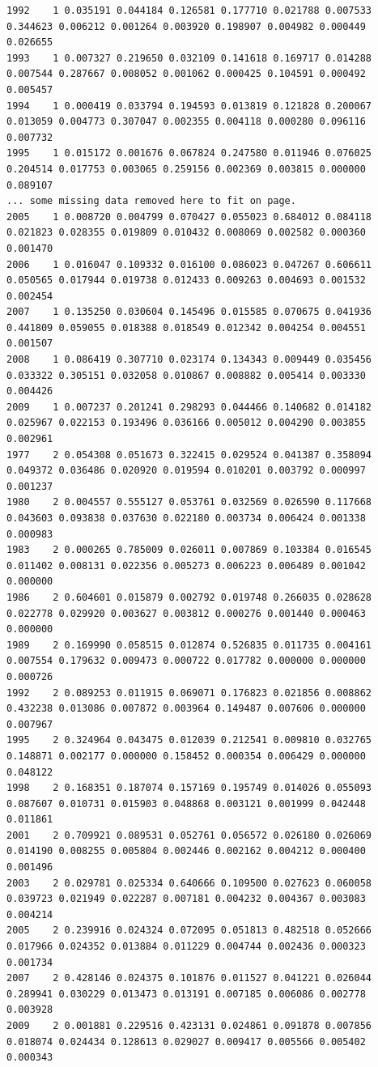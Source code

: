\begin{landscape}
\begin{table}
\begin{footnotesize}
\begin{verbatim}
1992    1 0.035191 0.044184 0.126581 0.177710 0.021788 0.007533 0.344623 0.006212 0.001264 0.003920 0.198907 0.004982 0.000449 0.026655
1993    1 0.007327 0.219650 0.032109 0.141618 0.169717 0.014288 0.007544 0.287667 0.008052 0.001062 0.000425 0.104591 0.000492 0.005457
1994    1 0.000419 0.033794 0.194593 0.013819 0.121828 0.200067 0.013059 0.004773 0.307047 0.002355 0.004118 0.000280 0.096116 0.007732
1995    1 0.015172 0.001676 0.067824 0.247580 0.011946 0.076025 0.204514 0.017753 0.003065 0.259156 0.002369 0.003815 0.000000 0.089107
...	some missing data removed here to fit on page.
2005    1 0.008720 0.004799 0.070427 0.055023 0.684012 0.084118 0.021823 0.028355 0.019809 0.010432 0.008069 0.002582 0.000360 0.001470
2006    1 0.016047 0.109332 0.016100 0.086023 0.047267 0.606611 0.050565 0.017944 0.019738 0.012433 0.009263 0.004693 0.001532 0.002454
2007    1 0.135250 0.030604 0.145496 0.015585 0.070675 0.041936 0.441809 0.059055 0.018388 0.018549 0.012342 0.004254 0.004551 0.001507
2008    1 0.086419 0.307710 0.023174 0.134343 0.009449 0.035456 0.033322 0.305151 0.032058 0.010867 0.008882 0.005414 0.003330 0.004426
2009    1 0.007237 0.201241 0.298293 0.044466 0.140682 0.014182 0.025967 0.022153 0.193496 0.036166 0.005012 0.004290 0.003855 0.002961
1977    2 0.054308 0.051673 0.322415 0.029524 0.041387 0.358094 0.049372 0.036486 0.020920 0.019594 0.010201 0.003792 0.000997 0.001237
1980    2 0.004557 0.555127 0.053761 0.032569 0.026590 0.117668 0.043603 0.093838 0.037630 0.022180 0.003734 0.006424 0.001338 0.000983
1983    2 0.000265 0.785009 0.026011 0.007869 0.103384 0.016545 0.011402 0.008131 0.022356 0.005273 0.006223 0.006489 0.001042 0.000000
1986    2 0.604601 0.015879 0.002792 0.019748 0.266035 0.028628 0.022778 0.029920 0.003627 0.003812 0.000276 0.001440 0.000463 0.000000
1989    2 0.169990 0.058515 0.012874 0.526835 0.011735 0.004161 0.007554 0.179632 0.009473 0.000722 0.017782 0.000000 0.000000 0.000726
1992    2 0.089253 0.011915 0.069071 0.176823 0.021856 0.008862 0.432238 0.013086 0.007872 0.003964 0.149487 0.007606 0.000000 0.007967
1995    2 0.324964 0.043475 0.012039 0.212541 0.009810 0.032765 0.148871 0.002177 0.000000 0.158452 0.000354 0.006429 0.000000 0.048122
1998    2 0.168351 0.187074 0.157169 0.195749 0.014026 0.055093 0.087607 0.010731 0.015903 0.048868 0.003121 0.001999 0.042448 0.011861
2001    2 0.709921 0.089531 0.052761 0.056572 0.026180 0.026069 0.014190 0.008255 0.005804 0.002446 0.002162 0.004212 0.000400 0.001496
2003    2 0.029781 0.025334 0.640666 0.109500 0.027623 0.060058 0.039723 0.021949 0.022287 0.007181 0.004232 0.004367 0.003083 0.004214
2005    2 0.239916 0.024324 0.072095 0.051813 0.482518 0.052666 0.017966 0.024352 0.013884 0.011229 0.004744 0.002436 0.000323 0.001734
2007    2 0.428146 0.024375 0.101876 0.011527 0.041221 0.026044 0.289941 0.030229 0.013473 0.013191 0.007185 0.006086 0.002778 0.003928
2009    2 0.001881 0.229516 0.423131 0.024861 0.091878 0.007856 0.018074 0.024434 0.128613 0.029027 0.009417 0.005566 0.005402 0.000343
\end{verbatim}
\end{footnotesize}
\end{table}
\end{landscape}
